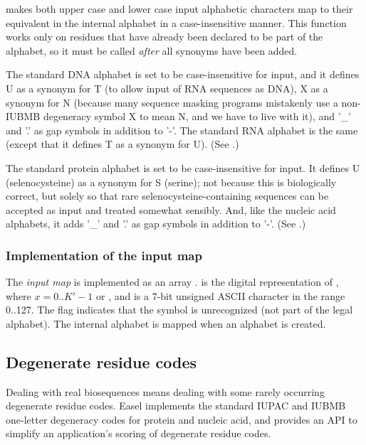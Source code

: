 makes both upper case and
lower case input alphabetic characters map to their equivalent in the
internal alphabet in a case-insensitive manner.  This function works
only on residues that have already been declared to be part of the
alphabet, so it must be called \emph{after} all synonyms have been
added.

The standard DNA alphabet is set to be case-insensitive for input, and
it defines U as a synonym for T (to allow input of RNA sequences as
DNA), X as a synonym for N (because many sequence masking programs
mistakenly use a non-IUBMB degeneracy symbol X to mean N, and we have
to live with it), and '\_' and '.' as gap symbols in addition to
'-'. The standard RNA alphabet is the same (except that it defines T
as a synonym for U). (See .)

The standard protein alphabet is set to be case-insensitive for input.
It defines U (selenocysteine) as a synonym for S (serine); not because
this is biologically correct, but solely so that rare
selenocysteine-containing sequences can be accepted as input and
treated somewhat sensibly. And, like the nucleic acid alphabets, it
adds '\_' and '.' as gap symbols in addition to '-'. (See
.)

\subsubsection{Implementation of the input map}

The \emph{input map} is implemented as an array
.   is the digital
representation of , where $x = 0..K'-1$ or
, and  is a 7-bit unsigned ASCII
character in the range 0..127.  The flag  indicates that the symbol is unrecognized (not part of
the legal alphabet).  The internal alphabet is mapped
 when an alphabet is created.


\subsection{Degenerate residue codes}

Dealing with real biosequences means dealing with some rarely
occurring degenerate residue codes. Easel implements the standard
IUPAC and IUBMB one-letter degeneracy codes for protein and nucleic
acid, and provides an API to simplify an application's scoring of
degenerate residue codes.

